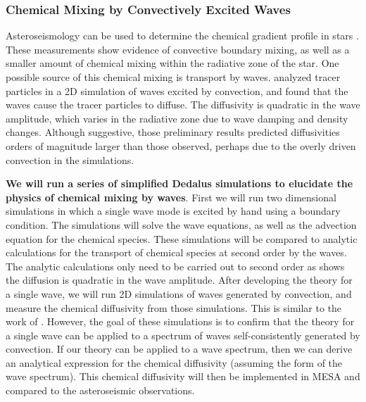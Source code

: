 {\color{purple}
\subsubsection{Chemical Mixing by Convectively Excited Waves}
}

Asteroseismology can be used to determine the chemical gradient profile in stars \citep{moravveji:15,moravveji:16,Ghasemi_2016}. These measurements show evidence of convective boundary mixing, as well as a smaller amount of chemical mixing within the radiative zone of the star. One possible source of this chemical mixing is transport by waves. \citet{Rogers2017} analyzed tracer particles in a 2D simulation of waves excited by convection, and found that the waves cause the tracer particles to diffuse. The diffusivity is quadratic in the wave amplitude, which varies in the radiative zone due to wave damping and density changes. Although suggestive, those preliminary results predicted diffusivities orders of magnitude larger than those observed, perhaps due to the overly driven convection in the simulations. 

\textbf{We will run a series of simplified Dedalus simulations to elucidate the physics of chemical mixing by waves}. First we will run two dimensional simulations in which a single wave mode is excited by hand using a boundary condition. The simulations will solve the wave equations, as well as the advection equation for the chemical species. These simulations will be compared to analytic calculations for the transport of chemical species at second order by the waves. The analytic calculations only need to be carried out to second order as \citet{Rogers2017} shows the diffusion is quadratic in the wave amplitude. After developing the theory for a single wave, we will run 2D simulations of waves generated by convection, and measure the chemical diffusivity from those simulations. This is similar to the work of \citet{Rogers2017}. However, the goal of these simulations is to confirm that the theory for a single wave can be applied to a spectrum of waves self-consistently generated by convection. If our theory can be applied to a wave spectrum, then we can derive an analytical expression for the chemical diffusivity (assuming the form of the wave spectrum). This chemical diffusivity will then be implemented in MESA and compared to the asteroseismic observations.
